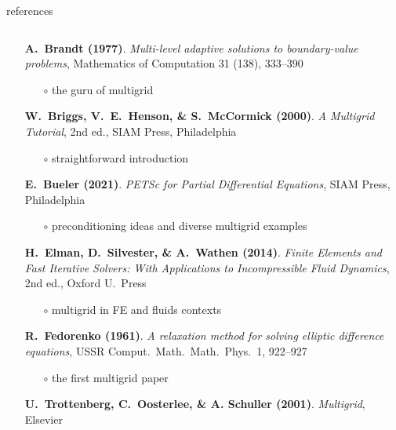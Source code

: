 \documentclass[10pt,
               svgnames,
               hyperref={colorlinks,citecolor=DeepPink4,linkcolor=FireBrick,urlcolor=Maroon},
               usepdftitle=false]{beamer}
\begin{document}
\begin{frame}{references}


\begin{columns}
\begin{column}{0.8\textwidth}
\begin{itemize}
\item[] \textbf{A.~Brandt (1977)}. \emph{Multi-level adaptive solutions to boundary-value problems}, Mathematics of Computation 31 (138), 333--390
    \begin{itemize}
    \item[$\circ$] the guru of multigrid
    \end{itemize}
\item[] \textbf{W.~Briggs, V.~E.~Henson, \& S.~McCormick (2000)}.  \emph{A Multigrid Tutorial}, 2nd ed., SIAM Press, Philadelphia
    \begin{itemize}
    \item[$\circ$] straightforward introduction
    \end{itemize}
\item[] \textbf{E.~Bueler (2021)}. \emph{PETSc for Partial Differential Equations}, SIAM Press, Philadelphia
    \begin{itemize}
    \item[$\circ$] preconditioning ideas and diverse multigrid examples
    \end{itemize}
\item[] \textbf{H.~Elman, D.~Silvester, \& A.~Wathen (2014)}. \emph{Finite Elements and Fast Iterative Solvers: With Applications to Incompressible Fluid Dynamics}, 2nd ed., Oxford U.~Press
    \begin{itemize}
    \item[$\circ$] multigrid in FE and fluids contexts
    \end{itemize}
\item[] \textbf{R.~Fedorenko (1961)}.  \emph{A relaxation method for solving elliptic difference equations}, USSR Comput.~Math.~Math.~Phys.~1, 922--927
    \begin{itemize}
    \item[$\circ$] the first multigrid paper
    \end{itemize}
\item[] \textbf{U.~Trottenberg, C.~Oosterlee, \& A. Schuller (2001)}.  \emph{Multigrid}, Elsevier
    \begin{itemize}

\end{itemize}
\end{itemize}
\end{column}
\end{columns}
\end{frame}
\end{document}
